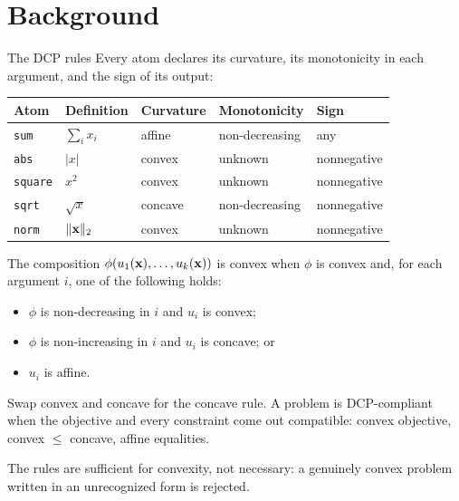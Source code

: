 \documentclass[10pt,mathserif,aspectratio=169]{beamer}
\begin{document}
\section{Background}

\begin{frame}[label=bk-dcp]{The DCP rules}
\vspace{-0.5ex}
{\small Every atom declares its curvature, its monotonicity in each argument, and the sign of
its output:}
\vspace{0.5ex}
\begin{center}\footnotesize
\begin{tabular}{l l l l l}
\toprule
Atom & Definition & Curvature & Monotonicity & Sign \\
\midrule
\texttt{sum}    & $\textstyle\sum_i x_i$ & affine  & non-decreasing & any \\
\texttt{abs}    & $|x|$                  & convex  & unknown        & nonnegative \\
\texttt{square} & $x^2$                  & convex  & unknown        & nonnegative \\
\texttt{sqrt}   & $\sqrt{x}$             & concave & non-decreasing & nonnegative \\
\texttt{norm}   & $\|\mathbf{x}\|_2$       & convex  & unknown        & nonnegative \\
\bottomrule
\end{tabular}
\end{center}

\vspace{1ex}
{\small The composition $\phi(u_1(\mathbf{x}), \dots, u_k(\mathbf{x}))$ is
{\color{polyblue}convex} when $\phi$ is convex and, for {\color{polyblue}each} argument $i$,
one of the following holds:}
\vspace{-0.5ex}
\begin{itemize}\small
  \item $\phi$ is non-decreasing in $i$ and $u_i$ is convex;
  \item $\phi$ is non-increasing in $i$ and $u_i$ is concave; or
  \item $u_i$ is affine.
\end{itemize}
\vspace{0.5ex}
{\small Swap convex and concave for the concave rule. A problem is DCP-compliant when the
objective and every constraint come out compatible: convex objective,
convex $\le$ concave, affine equalities.}

\vspace{1ex}
\begin{center}\small
The rules are sufficient for convexity, not necessary: a genuinely convex problem written in an
unrecognized form is rejected.
\end{center}
\end{frame}
\end{document}
